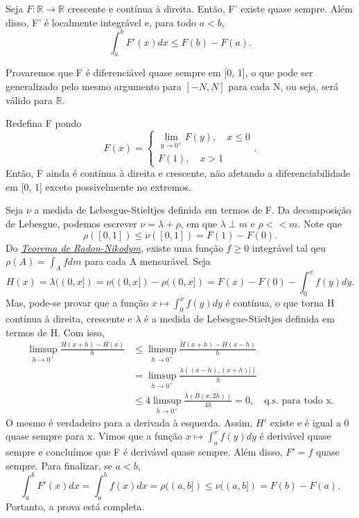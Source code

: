 \documentclass[MeasureTheory/measure_theory.tex]{subfiles}
\begin{document}
\begin{prop*}
	Seja \(F:\mathbb{R}\rightarrow \mathbb{R}\) crescente e contínua à direita. Então, F' existe quase sempre. Além disso, F' é localmente integrável e, para todo \(a< b\),
	\[
		\int_{a}^{b}F'(x)dx \leq F(b) - F(a).
	\]
\end{prop*}
\begin{proof*}
	Provaremos que F é diferenciável quase sempre em [0, 1], o que pode ser generalizado pelo mesmo argumento para \([-N, N]\) para cada N, ou seja, será válido para \(\mathbb{R}.\)

	Redefina F pondo
	\[
		F(x) = \left\{\begin{array}{ll}
			\lim_{y\to 0^{+}}F(y),\quad x \leq 0 \\
			F(1),\quad x > 1
		\end{array}\right..
	\]
	Então, F ainda é contínua à direita e crescente, não afetando a diferenciabilidade em [0, 1] exceto possivelmente no extremos.

	Seja \(\nu \) a medida de Lebesgue-Stieltjes definida em termos de F. Da decomposição de Lebesgue, podemos escrever \(\nu = \lambda +\rho \), em que \(\lambda \perp m\) e \(\rho << m.\) Note que
	\[
		\rho ([0, 1]) \leq \nu ([0,1]) = F(1) - F(0).
	\]
	Do \hyperlink{radon_nikodym}{\textit{Teorema de Radon-Nikodym}}, existe uma função \(f\geq 0\) integrável tal qeu \(\rho (A) = \int_{A}^{}fdm\) para cada A mensurável. Seja
	\[
		H(x) = \lambda ((0, x]) = \nu ((0, x]) - \rho ((0, x]) = F(x) - F(0) - \int_{0}^{x}f(y)dy.
	\]
	Mas, pode-se provar que a função \(x\mapsto \int_{0}^{x}f(y)dy\) é contínua, o que torna H contínua à direita, crescente e \(\lambda \) é a medida de Lebesgue-Stieltjes definida em termos de H. Com isso,
	\begin{align*}
		\limsup_{h\to 0^{+}}\frac{H(x+h) - H(x)}{h} & \leq \limsup_{h\to 0^{+}}\frac{H(x+h) - H(x-h)}{h}                                         \\
		                                            & =\limsup_{h\to 0^{+}}\frac{\lambda ((x-h), (x+h)])}{h}                                     \\
		                                            & \leq 4\limsup_{h\to 0^{+}}\frac{\lambda (B(x, 2h))}{4h} = 0,\quad \text{q.s. para todo x.}
	\end{align*}
	O mesmo é verdadeiro para a derivada à esquerda. Assim, \(H'\) existe e é igual a 0 quase sempre para x. Vimos que a função \(x\mapsto \int_{a}^{x}f(y)dy\) é derivável quase sempre e concluímos que F é derivável quase sempre. Além disso, \(F'=f\) quase sempre. Para finalizar, se
	\(a < b\),
	\[
		\int_{a}^{b}F'(x)dx = \int_{a}^{b}f(x)dx = \rho ((a, b])\leq \nu ((a, b]) = F(b) - F(a).
	\]
	Portanto, a prova está completa. \qedsymbol
\end{proof*}
\end{document}
